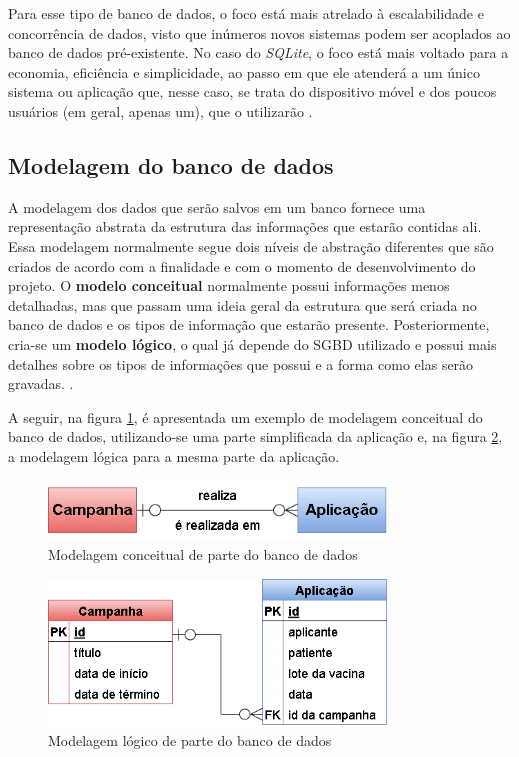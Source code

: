 Para esse tipo de banco de dados, o foco está mais atrelado à escalabilidade e concorrência de dados, visto que inúmeros novos sistemas podem ser acoplados ao banco de dados pré-existente. No caso do \textit{SQLite}, o foco está mais voltado para a economia, eficiência e simplicidade, ao passo em que ele atenderá a um único sistema ou aplicação que, nesse caso, se trata do dispositivo móvel e dos poucos usuários (em geral, apenas um), que o utilizarão \cite{sqlite_use}.

\subsection{Modelagem do banco de dados}
\label{cap2:SubSec:ModelagemBD}

A modelagem dos dados que serão salvos em um banco fornece uma representação abstrata da estrutura das informações que estarão contidas ali. Essa modelagem normalmente segue dois níveis de abstração diferentes que são criados de acordo com a finalidade e com o momento de desenvolvimento do projeto. O \textbf{modelo conceitual} normalmente possui informações menos detalhadas, mas que passam uma ideia geral da estrutura que será criada no banco de dados e os tipos de informação que estarão presente. Posteriormente, cria-se um \textbf{modelo lógico}, o qual já depende do SGBD utilizado e possui mais detalhes sobre os tipos de informações que possui e a forma como elas serão gravadas. \cite{heuser09banco}.

A seguir, na figura \ref{fig:diagrama_er}, é apresentada um exemplo de modelagem conceitual do banco de dados, utilizando-se uma parte simplificada da aplicação e, na figura \ref{fig:diagrama_logico}, a modelagem lógica para a mesma parte da aplicação.

\begin{figure}[!ht]
    \centering
    \includegraphics[width=0.8\textwidth]{figuras/cap2/2_3_2_diagrama-er.png}
    \caption{Modelagem conceitual de parte do banco de dados}
    \label{fig:diagrama_er}
\end{figure}

\begin{figure}[!ht]
    \centering
    \includegraphics[width=0.8\textwidth]{figuras/cap2/2_3_2_diagrama-logico.png}
    \caption{Modelagem lógico de parte do banco de dados}
    \label{fig:diagrama_logico}
\end{figure}


